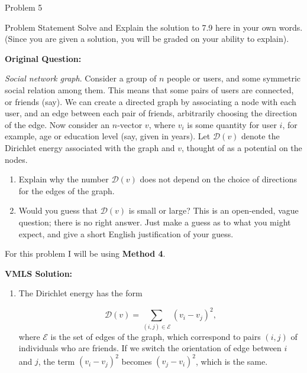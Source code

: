 \begin{problem}{Problem 5}
    \begin{statement}{Problem Statement}
        Solve and Explain the solution to 7.9 here in your own words. (Since you are given a solution, you will be graded on your ability to explain). \vspace*{1em}

        \noindent \textbf{Original Question:} \vspace*{1em}

        \textit{Social network graph}. Consider a group of $n$ people or users, and some symmetric social relation among them. This means that some pairs of users are connected, or friends (say). We can create 
        a directed graph by associating a node with each user, and an edge between each pair of friends, arbitrarily choosing the direction of the edge. Now consider an $n$-vector $v$, where $v_{i}$ 
        is some quantity for user $i$, for example, age or education level (say, given in years). Let $\mathcal{D}(v)$ denote the Dirichlet energy associated with the graph and $v$, thought of as a 
        potential on the nodes.

        \begin{enumerate}[label = (\alph*)]
            \item Explain why the number $\mathcal{D}(v)$ does not depend on the choice of directions for the edges of the graph.
            \item Would you guess that $\mathcal{D}(v)$ is small or large? This is an open-ended, vague question; there is no right answer. Just make a guess as to what you might expect, and give a 
            short English justification of your guess.
        \end{enumerate}
    \end{statement}

    \begin{Highlight}
        For this problem I will be using \textbf{Method 4}. \vspace*{1em}

        \noindent \textbf{VMLS Solution:} 

        \begin{enumerate}[label = (\alph*)]
            \item The Dirichlet energy has the form
            
            \begin{equation*}
                \mathcal{D}(v) = \sum_{(i,j) \in \mathcal{E}} (v_{i} - v_{j})^{2},
            \end{equation*}
            where $\mathcal{E}$ is the set of edges of the graph, which correspond to pairs $(i, j)$ of individuals who are friends. If we switch the orientation of edge between $i$ and $j$, the term 
            $(v_{i} - v_{j})^{2}$ becomes $(v_{j} - v_{i})^{2}$, which is the same.
        \end{enumerate}


\end{Highlight}
\end{problem}
